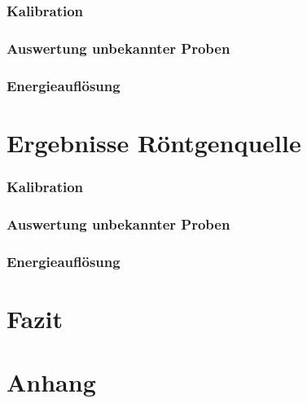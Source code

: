 \documentclass[12pt,a4paper]{article}
\begin{document}
\subsubsection{Kalibration}
\subsubsection{Auswertung unbekannter Proben}
\subsubsection{Energieauflösung}
\section{Ergebnisse Röntgenquelle}
\subsubsection{Kalibration}
\subsubsection{Auswertung unbekannter Proben}
\subsubsection{Energieauflösung}

\section{Fazit}
\section{Anhang}
\end{document}
